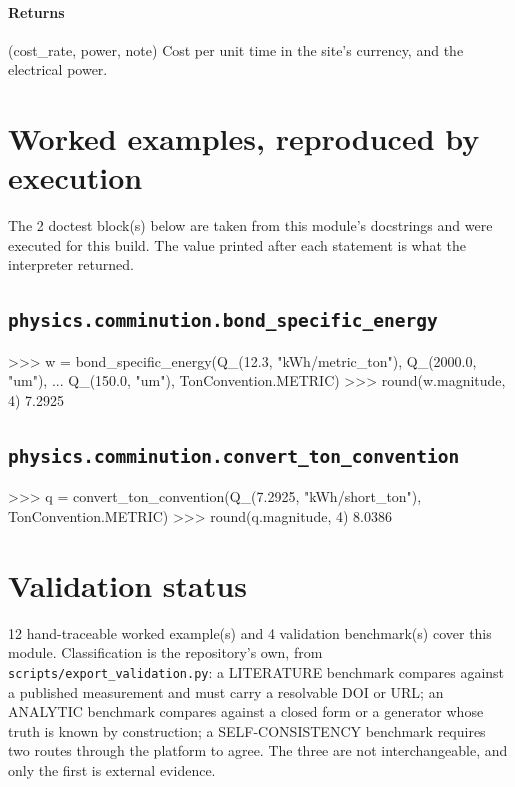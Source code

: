 \documentclass[10pt,a4paper,twoside]{report}
\begin{document}
\paragraph*{Returns}

(cost\_rate, power, note) Cost per unit time in the site's currency, and the electrical power.

\section{Worked examples, reproduced by execution}

The 2 doctest block(s) below are taken from this module's docstrings and were executed for this build. The value printed after each statement is what the interpreter returned.

\subsection*{\texttt{physics.comminution.bond\_specific\_energy}}

\begin{doctestblock}
>>> w = bond_specific_energy(Q_(12.3, "kWh/metric_ton"), Q_(2000.0, "um"),
...                          Q_(150.0, "um"), TonConvention.METRIC)
>>> round(w.magnitude, 4)
7.2925
\end{doctestblock}

\subsection*{\texttt{physics.comminution.convert\_ton\_convention}}

\begin{doctestblock}
>>> q = convert_ton_convention(Q_(7.2925, "kWh/short_ton"), TonConvention.METRIC)
>>> round(q.magnitude, 4)
8.0386
\end{doctestblock}

\section{Validation status}

12 hand-traceable worked example(s) and 4 validation benchmark(s) cover this module. Classification is the repository's own, from \texttt{scripts/export\_validation.py}: a LITERATURE benchmark compares against a published measurement and must carry a resolvable DOI or URL; an ANALYTIC benchmark compares against a closed form or a generator whose truth is known by construction; a SELF-CONSISTENCY benchmark requires two routes through the platform to agree. The three are not interchangeable, and only the first is external evidence.
\end{document}
